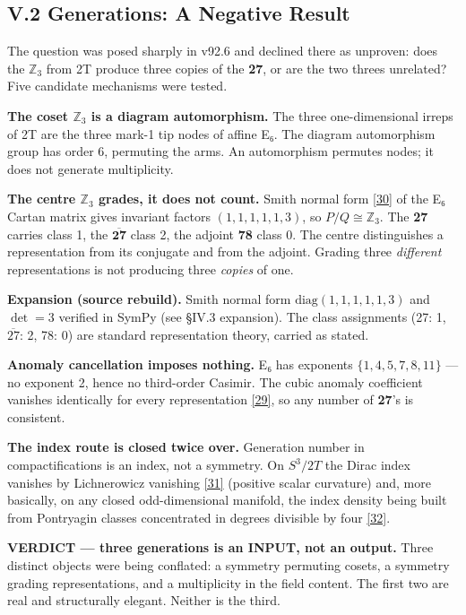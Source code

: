 \documentclass[a4paper,11pt]{article}
\newcommand{\expansion}[1]{\par\smallskip\noindent\textbf{Expansion (source rebuild).} #1\par\smallskip}
\begin{document}
\subsection*{V.2 Generations: A Negative Result}

The question was posed sharply in v92.6 and declined there as unproven: does the $\mathbb{Z}_3$ from 2T produce three copies of the \textbf{27}, or are the two threes unrelated? Five candidate mechanisms were tested.

\textbf{The coset $\mathbb{Z}_3$ is a diagram automorphism.} The three one-dimensional irreps of 2T are the three mark-1 tip nodes of affine E₆. The diagram automorphism group has order 6, permuting the arms. An automorphism permutes nodes; it does not generate multiplicity.

\textbf{The centre $\mathbb{Z}_3$ grades, it does not count.} Smith normal form \hyperref[ref30]{[30]} of the E₆ Cartan matrix gives invariant factors $(1,1,1,1,1,3)$, so $P/Q\cong\mathbb{Z}_3$. The \textbf{27} carries class 1, the $\overline{\mathbf{27}}$ class 2, the adjoint \textbf{78} class 0. The centre distinguishes a representation from its conjugate and from the adjoint. Grading three \textit{different} representations is not producing three \textit{copies} of one.


\expansion{Smith normal form $\mathrm{diag}(1,1,1,1,1,3)$ and $\det = 3$ verified in SymPy (see \S IV.3 expansion). The class assignments (27: 1, $\overline{27}$: 2, 78: 0) are standard representation theory, carried as stated.}
\textbf{Anomaly cancellation imposes nothing.} E₆ has exponents $\{1,4,5,7,8,11\}$ — no exponent 2, hence no third-order Casimir. The cubic anomaly coefficient vanishes identically for every representation \hyperref[ref29]{[29]}, so any number of \textbf{27}'s is consistent.

\textbf{The index route is closed twice over.} Generation number in compactifications is an index, not a symmetry. On $S^3/2T$ the Dirac index vanishes by Lichnerowicz vanishing \hyperref[ref31]{[31]} (positive scalar curvature) and, more basically, on any closed odd-dimensional manifold, the index density being built from Pontryagin classes concentrated in degrees divisible by four \hyperref[ref32]{[32]}.

\textbf{VERDICT — three generations is an INPUT, not an output.} Three distinct objects were being conflated: a symmetry permuting cosets, a symmetry grading representations, and a multiplicity in the field content. The first two are real and structurally elegant. Neither is the third.
\end{document}

